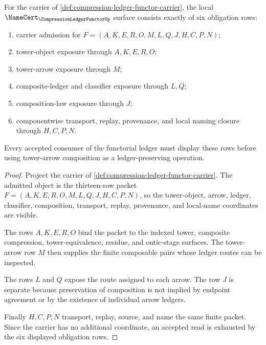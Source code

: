 \begin{theorem}
\label{thm:compression-ledger-functor-namecert-obligations}
For the carrier of \autoref{def:compression-ledger-functor-carrier}, the local $\NameCert_{\CompressionLedgerFunctorUp}$ surface consists exactly of six obligation rows:
\begin{enumerate}
\item carrier admission for $F=(A,K,E,R,O,M,L,Q,J,H,C,P,N)$;
\item tower-object exposure through $A,K,E,R,O$;
\item tower-arrow exposure through $M$;
\item composite-ledger and classifier exposure through $L,Q$;
\item composition-law exposure through $J$;
\item componentwise transport, replay, provenance, and local naming closure through $H,C,P,N$.
\end{enumerate}
Every accepted consumer of the functorial ledger must display these rows before using tower-arrow composition as a ledger-preserving operation.
\end{theorem}
\begin{proof}
Project the carrier of \autoref{def:compression-ledger-functor-carrier}. The admitted object is the thirteen-row packet $F=(A,K,E,R,O,M,L,Q,J,H,C,P,N)$, so the tower-object, arrow, ledger, classifier, composition, transport, replay, provenance, and local-name coordinates are visible.

The rows $A,K,E,R,O$ bind the packet to the indexed tower, composite compression, tower-equivalence, residue, and ontic-stage surfaces. The tower-arrow row $M$ then supplies the finite composable pairs whose ledger routes can be inspected.

The rows $L$ and $Q$ expose the route assigned to each arrow. The row $J$ is separate because preservation of composition is not implied by endpoint agreement or by the existence of individual arrow ledgers.

Finally $H,C,P,N$ transport, replay, source, and name the same finite packet. Since the carrier has no additional coordinate, an accepted read is exhausted by the six displayed obligation rows.
\end{proof}

